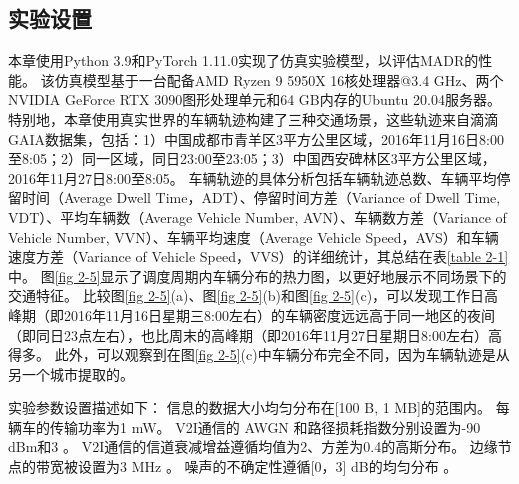 \subsection{实验设置}
本章使用Python 3.9和PyTorch 1.11.0实现了仿真实验模型，以评估MADR的性能。
该仿真模型基于一台配备AMD Ryzen 9 5950X 16核处理器@3.4 GHz、两个NVIDIA GeForce RTX 3090图形处理单元和64 GB内存的Ubuntu 20.04服务器。
特别地，本章使用真实世界的车辆轨迹构建了三种交通场景，这些轨迹来自滴滴GAIA数据集，包括：1）中国成都市青羊区3平方公里区域，2016年11月16日8:00至8:05；2）同一区域，同日23:00至23:05；3）中国西安碑林区3平方公里区域，2016年11月27日8:00至8:05。
车辆轨迹的具体分析包括车辆轨迹总数、车辆平均停留时间（Average Dwell Time，ADT）、停留时间方差（Variance of Dwell Time, VDT）、平均车辆数（Average Vehicle Number, AVN）、车辆数方差（Variance of Vehicle Number, VVN）、车辆平均速度（Average Vehicle Speed，AVS）和车辆速度方差（Variance of Vehicle Speed，VVS）的详细统计，其总结在表\ref{table 2-1}中。
图\ref{fig 2-5}显示了调度周期内车辆分布的热力图，以更好地展示不同场景下的交通特征。
比较图\ref{fig 2-5}(a)、图\ref{fig 2-5}(b)和图\ref{fig 2-5}(c)，可以发现工作日高峰期（即2016年11月16日星期三8:00左右）的车辆密度远远高于同一地区的夜间（即同日23点左右），也比周末的高峰期（即2016年11月27日星期日8:00左右）高得多。
此外，可以观察到在图\ref{fig 2-5}(c)中车辆分布完全不同，因为车辆轨迹是从另一个城市提取的。

实验参数设置描述如下：
信息的数据大小均匀分布在[100 B, 1 MB]的范围内。
每辆车的传输功率为1 mW。
V2I通信的 AWGN 和路径损耗指数分别设置为-90 dBm和3 \cite{sadek2009distributed}。
V2I通信的信道衰减增益遵循均值为2、方差为0.4的高斯分布。
边缘节点的带宽被设置为3 MHz \cite{wang2019delay}。
噪声的不确定性遵循[0，3] dB的均匀分布 \cite{tandra2008snr}。

\begin{table}[h]\small
{} %
\centering
{}
\label{table 2-1}
\end{table}

